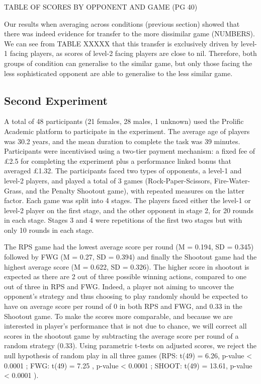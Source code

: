 \documentclass[,man,floatsintext]{apa6}
\begin{document}
TABLE OF SCORES BY OPPONENT AND GAME (PG 40)

Our results when averaging across conditions (previous section) showed that there was indeed evidence for transfer to the more dissimilar game (NUMBERS). We can see from TABLE XXXXX that this transfer is exclusively driven by level-1 facing players, as scores of level-2 facing players are close to nil. Therefore, both groups of condition can generalise to the similar game, but only those facing the less sophisticated opponent are able to generalise to the less similar game.

\hypertarget{second-experiment-1}{%
\subsection{Second Experiment}\label{second-experiment-1}}

A total of 48 participants (21 females, 28 males, 1 unknown) used the Prolific Academic platform to participate in the experiment. The average age of players was 30.2 years, and the mean duration to complete the task was 39 minutes. Participants were incentivised using a two-tier payment mechanism: a fixed fee of £2.5 for completing the experiment plus a performance linked bonus that averaged £1.32. The participants faced two types of opponents, a level-1 and level-2 players, and played a total of 3 games (Rock-Paper-Scissors, Fire-Water-Grass, and the Penalty Shootout game), with repeated measures on the latter factor. Each game was split into 4 stages. The players faced either the level-1 or level-2 player on the first stage, and the other opponent in stage 2, for 20 rounds in each stage. Stages 3 and 4 were repetitions of the first two stages but with only 10 rounds in each stage.

The RPS game had the lowest average score per round (M = 0.194, SD = 0.345) followed by FWG (M = 0.27, SD = 0.394) and finally the Shootout game had the highest average score (M = 0.622, SD = 0.326). The higher score in shootout is expected as there are 2 out of three possible winning actions, compared to one out of three in RPS and FWG. Indeed, a player not aiming to uncover the opponent's strategy and thus choosing to play randomly should be expected to have on average score per round of 0 in both RPS and FWG, and 0.33 in the Shootout game. To make the scores more comparable, and because we are interested in player's performance that is not due to chance, we will correct all scores in the shootout game by subtracting the average score per round of a random strategy (0.33). Using parametric t-tests on adjusted scores, we reject the null hypothesis of random play in all three games (RPS: t(49) = 6.26, p-value \textless{} 0.0001 ; FWG: t(49) = 7.25 , p-value \textless{} 0.0001 ; SHOOT: t(49) = 13.61, p-value \textless{} 0.0001 ).
\end{document}
